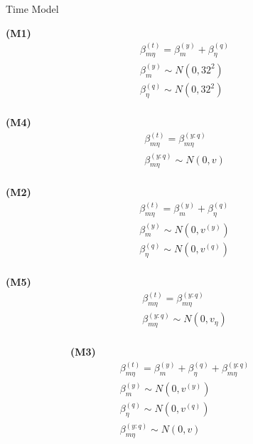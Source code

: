\documentclass[ xcolor = pdftex, dvipsnames, table ]{beamer}
\begin{document}
%
%

%
\begin{frame}{Time Model}
\hspace*{-0.5cm}
\begin{minipage}{0.3\textwidth}
\begin{center}
\textbf{(M1)}
\begin{eqnarray*}
&\beta^{(t)}_{m\eta} = \beta^{(y)}_{m} + \beta^{(q)}_{\eta}&\\
&\beta^{(y)}_{m} \sim N(0, 32^2)&\\
&\beta^{(q)}_{\eta} \sim N(0, 32^2)&\\
&~&
\end{eqnarray*}
\end{center}

\begin{center}
\textbf{(M4)}
\begin{eqnarray*}
&\beta^{(t)}_{m\eta} = \beta^{(y:q)}_{m\eta}&\\
&\beta^{(y:q)}_{m\eta} \sim N(0, v)&\\
&~&
\end{eqnarray*}
\end{center}
\end{minipage}
\begin{minipage}{0.3\textwidth}
\begin{center}
\textbf{(M2)}
\begin{eqnarray*}
&\beta^{(t)}_{m\eta} = \beta^{(y)}_{m} + \beta^{(q)}_{\eta}&\\
&\beta^{(y)}_{m} \sim N(0, v^{(y)})&\\
&\beta^{(q)}_{\eta} \sim N(0, v^{(q)})&\\
&~&
\end{eqnarray*}
\end{center}

\begin{center}
\textbf{(M5)}
\begin{eqnarray*}
&\beta^{(t)}_{m\eta} = \beta^{(y:q)}_{m\eta}&\\
&\beta^{(y:q)}_{m\eta} \sim N(0, v_\eta)&\\
&~&
\end{eqnarray*}
\end{center}
\end{minipage}
\begin{minipage}{0.3\textwidth}
\begin{center}
~~~~~~~~~~~~~\textbf{(M3)}
\begin{eqnarray*}
&\beta^{(t)}_{m\eta} = \beta^{(y)}_{m} + \beta^{(q)}_{\eta} + \beta^{(y:q)}_{m\eta} & \\
&\beta^{(y)}_{m} \sim N(0, v^{(y)}) & \\
&\beta^{(q)}_{\eta} \sim N(0, v^{(q)}) & \\
&\beta^{(y:q)}_{m\eta} \sim N(0, v) &
\end{eqnarray*}
\end{center}


\end{minipage}
\end{frame}
\end{document}
